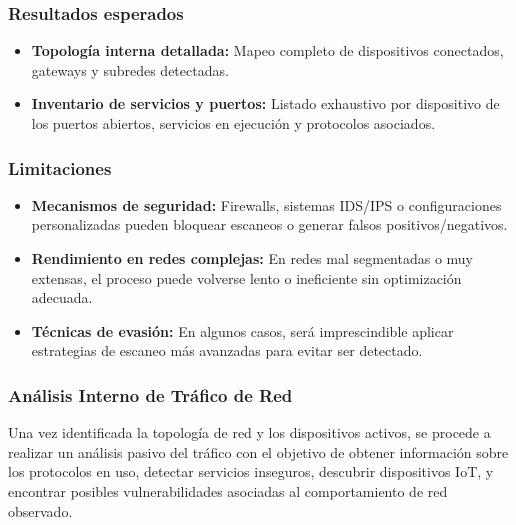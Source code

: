 \documentclass[a4paper, 11pt]{article}
\begin{document}
\subsubsection*{Resultados esperados}
\begin{itemize}

    \item \textbf{Topología interna detallada:} Mapeo completo de dispositivos conectados, gateways y subredes detectadas. 
    
    \item \textbf{Inventario de servicios y puertos:} Listado exhaustivo por dispositivo de los puertos abiertos, servicios en ejecución y protocolos asociados.
\end{itemize}

\subsubsection*{Limitaciones}

\begin{itemize}
   
    \item \textbf{Mecanismos de seguridad:} Firewalls, sistemas IDS/IPS o configuraciones personalizadas pueden bloquear escaneos o generar falsos positivos/negativos.
    
    \item \textbf{Rendimiento en redes complejas:} En redes mal segmentadas o muy extensas, el proceso puede volverse lento o ineficiente sin optimización adecuada.
    
    \item \textbf{Técnicas de evasión:} En algunos casos, será imprescindible aplicar estrategias de escaneo más avanzadas para evitar ser detectado.
\end{itemize}

\par\vspace{0.5cm}

\subsubsection{Análisis Interno de Tráfico de Red}

Una vez identificada la topología de red y los dispositivos activos, se procede a realizar un análisis pasivo del tráfico con el objetivo 
de obtener información sobre los protocolos en uso, detectar servicios inseguros, descubrir dispositivos IoT, y encontrar posibles vulnerabilidades asociadas al comportamiento de red observado.
\par\vspace{0.5cm}
\end{document}
